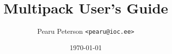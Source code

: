 \documentclass[a4paper,12pt]{article}
\title{Multipack User's Guide}
\author{Pearu Peterson \texttt{<pearu@ioc.ee>}}
\date{\today}
\begin{document}
\tableofcontents






\pythonclean
\end{document}
